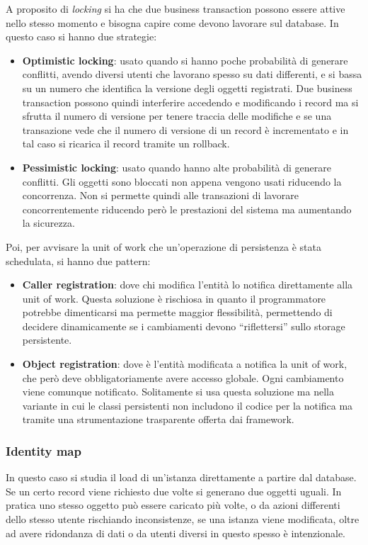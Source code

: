 A proposito di \textit{locking} si ha che due business transaction possono essere attive nello stesso momento e bisogna capire come devono lavorare sul database. In questo caso si hanno due strategie:
\begin{itemize}
    \item \textbf{Optimistic locking}: usato quando si hanno poche probabilità di generare conflitti, avendo diversi utenti che lavorano spesso su dati differenti, e si bassa su un numero che identifica la versione degli oggetti registrati. Due business transaction possono quindi interferire accedendo e modificando i record ma si sfrutta il numero di versione per tenere traccia delle modifiche e se una transazione vede che il numero di versione di un record è incrementato e in tal caso si ricarica il record tramite un rollback.
    \item \textbf{Pessimistic locking}: usato quando hanno alte probabilità di generare conflitti. Gli oggetti sono bloccati non appena vengono usati riducendo la concorrenza. Non si permette quindi alle transazioni di lavorare concorrentemente riducendo però le prestazioni del sistema ma aumentando la sicurezza.
\end{itemize}
Poi, per avvisare la unit of work che un'operazione di persistenza è stata schedulata, si hanno due pattern:
\begin{itemize}
    \item \textbf{Caller registration}: dove chi modifica l'entità lo notifica direttamente alla unit of work. Questa soluzione è rischiosa in quanto il programmatore potrebbe dimenticarsi ma permette maggior flessibilità, permettendo di decidere dinamicamente se i cambiamenti devono “riflettersi” sullo storage persistente.
    \item \textbf{Object registration}: dove è l'entità modificata a notifica la unit of work, che però deve obbligatoriamente avere accesso globale. Ogni cambiamento viene comunque notificato. Solitamente si usa questa soluzione ma nella variante in cui le classi persistenti non includono il codice per la notifica ma tramite una strumentazione trasparente offerta dai framework.
\end{itemize}
\subsubsection{Identity map}
In questo caso si studia il load di un'istanza direttamente a partire dal database. Se un certo record viene richiesto due volte si generano due oggetti uguali. In pratica uno stesso oggetto può essere caricato più volte, o da azioni differenti dello stesso utente rischiando inconsistenze, se una istanza viene modificata, oltre ad avere ridondanza di dati o da utenti diversi in questo spesso è intenzionale.

